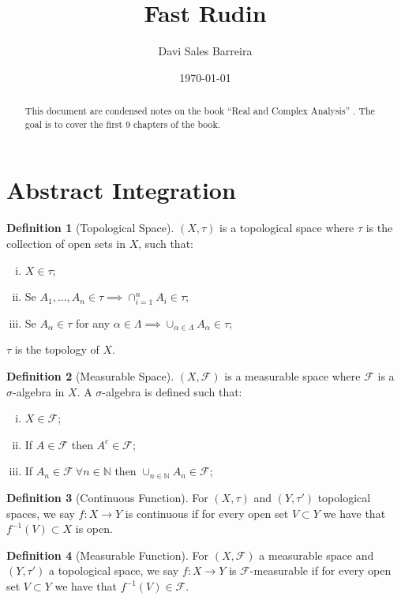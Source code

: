 \documentclass[10pt]{article}
\title{Fast Rudin}
\author{Davi Sales Barreira}
\date{\today}
\theoremstyle{definition}
\newtheorem{definition}{Definition}[section]
\begin{document}
\maketitle
\begin{abstract}
	This document are condensed notes on the book
	``Real and Complex Analysis'' \citep{rudin1987real}. The goal is to cover the
	first 9 chapters of the book.
\end{abstract}

\section{Abstract Integration}

\begin{definition}[Topological Space]
	$(X,\tau)$ is a topological space where $\tau$ is the collection of open
	sets in $X$, such that:
	\begin{enumerate}[(i)]
		\item $X \in \tau$;
		\item Se $A_1,...,A_n \in \tau \implies \cap_{i=1}^n A_i \in \tau$;
		\item Se $A_\alpha \in \tau$ for any $\alpha \in \Lambda \implies \cup_{\alpha \in \Lambda} A_\alpha \in \tau$;
	\end{enumerate}
	$\tau$ is the topology of $X$.
\end{definition}

\begin{definition}[Measurable Space]
	$(X,\mathcal F)$ is a measurable space where $\mathcal F$ is a $\sigma$-algebra in $X$.
	A $\sigma$-algebra is defined such that:
	\begin{enumerate}[(i)]
		\item $X \in \mathcal F$;
		\item If $A \in \mathcal F$ then $A^c \in \mathcal F$;
		\item If $A_n \in \mathcal F \ \forall n \in \mathbb N$ then $\cup_{n \in \mathbb N} A_n \in \mathcal F$;
	\end{enumerate}
\end{definition}

\begin{definition}[Continuous Function]
	For $(X,\tau)$ and $(Y,\tau')$ topological spaces, we say $f:X \to Y$ is continuous if for every open set
	$V \subset Y$ we have that $f^{-1}(V) \subset X$ is open.
\end{definition}

\begin{definition}[Measurable Function]
	For $(X,\mathcal F)$ a measurable space and $(Y,\tau')$ a topological space, we say $f:X \to Y$ is
	$\mathcal F$-measurable if for every open set
	$V \subset Y$ we have that $f^{-1}(V) \in \mathcal F$.
\end{definition}

  
  
\end{document}
